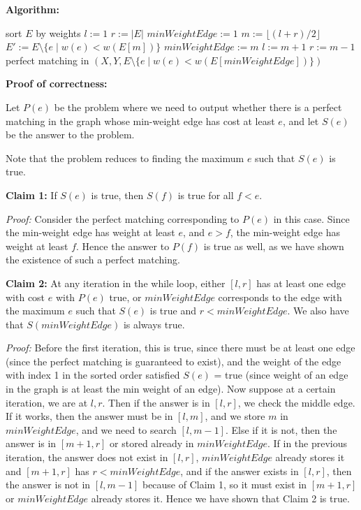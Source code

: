 \documentclass[answers]{exam}
\begin{document}
\begin{questions}
\begin{solution}
    \textbf{Algorithm:}

    \begin{algorithmic}
            \State sort $E$ by weights
            \State $l := 1$
            \State $r := |E|$
            \State $minWeightEdge := 1$
                \State $m := \lfloor (l + r) / 2 \rfloor$
                \State $E' := E \setminus \{e \mid w(e) < w(E[m])\}$
                    \State $minWeightEdge := m$
                    \State $l := m + 1$
                \Else
                    \State $r := m - 1$
                \EndIf
            \EndWhile
            \State \Return perfect matching in $(X, Y, E \setminus \{e \mid w(e) < w(E[minWeightEdge])\})$
        \EndFunction
    \end{algorithmic}

    \textbf{Proof of correctness:}

    Let $P(e)$ be the problem where we need to output whether there is a perfect matching in the graph whose min-weight edge has cost at least $e$, and let $S(e)$ be the answer to the problem.

    Note that the problem reduces to finding the maximum $e$ such that $S(e)$ is true.

    \textbf{Claim 1:} If $S(e)$ is true, then $S(f)$ is true for all $f < e$.

    \textit{Proof:} Consider the perfect matching corresponding to $P(e)$ in this case. Since the min-weight edge has weight at least $e$, and $e > f$, the min-weight edge has weight at least $f$.
    Hence the answer to $P(f)$ is true as well, as we have shown the existence of such a perfect matching.

    \textbf{Claim 2:} At any iteration in the while loop, either $[l, r]$ has at least one edge with cost $e$ with $P(e)$ true, or $minWeightEdge$ corresponds to the edge with the maximum $e$ such
    that $S(e)$ is true and $r < minWeightEdge$. We also have that $S(minWeightEdge)$ is always true.

    \textit{Proof:} Before the first iteration, this is true, since there must be at least one edge (since the perfect matching is guaranteed to exist), and the weight of the edge with index 1 in the
    sorted order satisfied $S(e)$ = true (since weight of an edge in the graph is at least the min weight of an edge). Now suppose at a certain iteration, we are at $l, r$. Then if the answer is in
    $[l, r]$, we check the middle edge. If it works, then the answer must be in $[l, m]$, and we store $m$ in $minWeightEdge$, and we need to search $[l, m - 1]$. Else if it is not, then the answer is
    in $[m+1, r]$ or stored already in $minWeightEdge$. If in the previous iteration, the answer does not exist in $[l, r]$, $minWeightEdge$ already stores it and $[m+1, r]$ has $r <
    minWeightEdge$, and if the answer exists in $[l, r]$, then the answer is not in $[l, m - 1]$ because of Claim 1, so it must exist in $[m + 1, r]$ or $minWeightEdge$ already stores it. Hence we have shown that Claim 2 is true.


\end{solution}
\end{questions}
\end{document}
